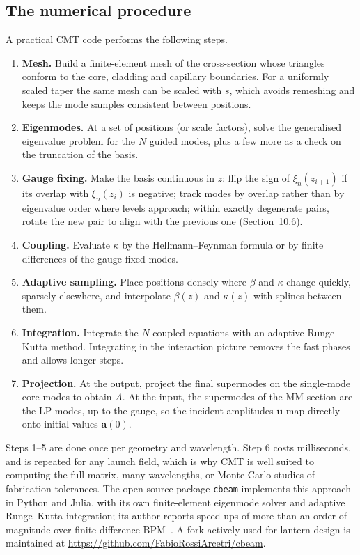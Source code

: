 \documentclass[11pt,a4paper]{article}
\newcommand{\uvec}{\mathbf{u}}
\begin{document}
\subsection{The numerical procedure}
A practical CMT code performs the following steps.
\begin{enumerate}
\item \textbf{Mesh.} Build a finite-element mesh of the cross-section whose triangles conform to the core, cladding and capillary boundaries. For a uniformly scaled taper the same mesh can be scaled with $s$, which avoids remeshing and keeps the mode samples consistent between positions.
\item \textbf{Eigenmodes.} At a set of positions (or scale factors), solve the generalised eigenvalue problem for the $N$ guided modes, plus a few more as a check on the truncation of the basis.
\item \textbf{Gauge fixing.} Make the basis continuous in $z$: flip the sign of $\xi_n(z_{i+1})$ if its overlap with $\xi_n(z_i)$ is negative; track modes by overlap rather than by eigenvalue order where levels approach; within exactly degenerate pairs, rotate the new pair to align with the previous one (Section~10.6).
\item \textbf{Coupling.} Evaluate $\kappa$ by the Hellmann--Feynman formula or by finite differences of the gauge-fixed modes.
\item \textbf{Adaptive sampling.} Place positions densely where $\beta$ and $\kappa$ change quickly, sparsely elsewhere, and interpolate $\beta(z)$ and $\kappa(z)$ with splines between them.
\item \textbf{Integration.} Integrate the $N$ coupled equations with an adaptive Runge--Kutta method. Integrating in the interaction picture removes the fast phases and allows longer steps.
\item \textbf{Projection.} At the output, project the final supermodes on the single-mode core modes to obtain $A$. At the input, the supermodes of the MM section are the LP modes, up to the gauge, so the incident amplitudes $\uvec$ map directly onto initial values $\mathbf{a}(0)$.
\end{enumerate}
Steps 1--5 are done once per geometry and wavelength. Step 6 costs milliseconds, and is repeated for any launch field, which is why CMT is well suited to computing the full matrix, many wavelengths, or Monte Carlo studies of fabrication tolerances. The open-source package \texttt{cbeam} implements this approach in Python and Julia, with its own finite-element eigenmode solver and adaptive Runge--Kutta integration; its author reports speed-ups of more than an order of magnitude over finite-difference BPM~\cite{Lin2024}. A fork actively used for lantern design is maintained at \url{https://github.com/FabioRossiArcetri/cbeam}.
\end{document}

